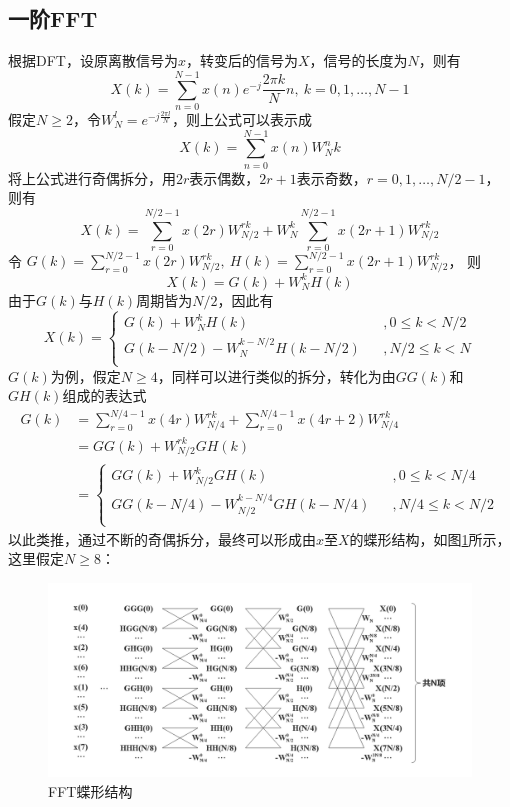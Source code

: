 \documentclass[UTF8]{ctexart}
\begin{document}
		\subsection{一阶FFT}
		根据DFT，设原离散信号为$x$，转变后的信号为$X$，信号的长度为$N$，则有
		\[
			X(k) = \sum_{n=0}^{N-1}x(n)e^{-j}\frac{2\pi k}{N}n,\ k=0,1,\ldots,N-1
		\]
		假定$N \ge 2$，令$W_N^l=e^{-j\frac{2\pi l}{N}}$，则上公式可以表示成
		\[
			X(k)=\sum_{n=0}^{N-1}x(n)W_N^nk
		\]
		将上公式进行奇偶拆分，用$2r$表示偶数，$2r+1$表示奇数，$r=0,1,\ldots,N/2-1$，则有
		\[
			X(k) = \sum_{r=0}^{N/2-1}x(2r)W_{N/2}^{rk}+W_N^k\sum_{r=0}^{N/2-1}x(2r+1)W_{N/2}^{rk}
		\]
		令
		$
			G(k)=\sum_{r=0}^{N/2-1}x(2r)W_{N/2}^{rk}
		,\  
			H(k)=\sum_{r=0}^{N/2-1}x(2r+1)W_{N/2}^{rk}
		$，
		则
		\[
			X(k)=G(k)+W_N^kH(k)
		\]
		由于$G(k)$与$H(k)$周期皆为$N/2$，因此有
		\[
			X(k)=\left\{
			\begin{array}{lcl}
			G(k) + W_N^kH(k) & & ,{0 \leq k < N/2} \\
			G(k-N/2)-W_N^{k-N/2}H(k-N/2) & & ,{N/2 \leq k < N} \\
			\end{array}
			\right.
		\]
		$G(k)$为例，假定$N \ge 4$，同样可以进行类似的拆分，转化为由$GG(k)$和$GH(k)$组成的表达式
		\[
			\begin{aligned}
			G(k) &= \sum_{r=0}^{N/4-1}x(4r)W_{N/4}^{rk} + \sum_{r=0}^{N/4-1}x(4r+2)W_{N/4}^{rk} \\
			&= GG(k) + W_{N/2}^{rk}GH(k) \\
			&= \left\{
			\begin{array}{lcl}
			GG(k) + W_{N/2}^kGH(k) & & ,{0 \leq k < N/4} \\
			GG(k-N/4)-W_{N/2}^{k-N/4}GH(k-N/4) & & ,{N/4 \leq k < N/2} \\
			\end{array}
			\right.
			\end{aligned}
		\]
		以此类推，通过不断的奇偶拆分，最终可以形成由$x$至$X$的蝶形结构，如图\ref{fft-btf}所示，这里假定$N \ge 8$：
		\begin{figure}[]
			\centering
			\includegraphics[width=1\textwidth]{fft.png}
			\caption{FFT蝶形结构}
			\label{fft-btf}
		\end{figure}
\end{document}
